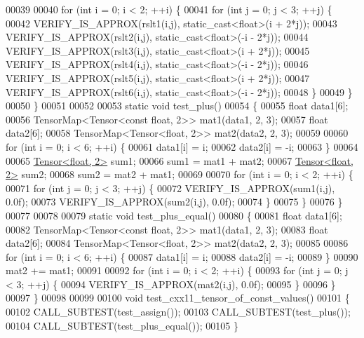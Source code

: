 \begin{DoxyCode}
00039 
00040   \textcolor{keywordflow}{for} (\textcolor{keywordtype}{int} i = 0; i < 2; ++i) \{
00041     \textcolor{keywordflow}{for} (\textcolor{keywordtype}{int} j = 0; j < 3; ++j) \{
00042       VERIFY\_IS\_APPROX(rslt1(i,j), static\_cast<float>(i + 2*j));
00043       VERIFY\_IS\_APPROX(rslt2(i,j), static\_cast<float>(-i - 2*j));
00044       VERIFY\_IS\_APPROX(rslt3(i,j), static\_cast<float>(i + 2*j));
00045       VERIFY\_IS\_APPROX(rslt4(i,j), static\_cast<float>(-i - 2*j));
00046       VERIFY\_IS\_APPROX(rslt5(i,j), static\_cast<float>(i + 2*j));
00047       VERIFY\_IS\_APPROX(rslt6(i,j), static\_cast<float>(-i - 2*j));
00048     \}
00049   \}
00050 \}
00051 
00052 
00053 \textcolor{keyword}{static} \textcolor{keywordtype}{void} test\_plus()
00054 \{
00055   \textcolor{keywordtype}{float} data1[6];
00056   TensorMap<Tensor<const float, 2>> mat1(data1, 2, 3);
00057   \textcolor{keywordtype}{float} data2[6];
00058   TensorMap<Tensor<float, 2>> mat2(data2, 2, 3);
00059 
00060   \textcolor{keywordflow}{for} (\textcolor{keywordtype}{int} i = 0; i < 6; ++i) \{
00061     data1[i] = i;
00062     data2[i] = -i;
00063   \}
00064 
00065   \hyperlink{class_eigen_1_1_tensor}{Tensor<float, 2>} sum1;
00066   sum1 = mat1 + mat2;
00067   \hyperlink{class_eigen_1_1_tensor}{Tensor<float, 2>} sum2;
00068   sum2 = mat2 + mat1;
00069 
00070   \textcolor{keywordflow}{for} (\textcolor{keywordtype}{int} i = 0; i < 2; ++i) \{
00071     \textcolor{keywordflow}{for} (\textcolor{keywordtype}{int} j = 0; j < 3; ++j) \{
00072       VERIFY\_IS\_APPROX(sum1(i,j), 0.0f);
00073       VERIFY\_IS\_APPROX(sum2(i,j), 0.0f);
00074     \}
00075   \}
00076 \}
00077 
00078 
00079 \textcolor{keyword}{static} \textcolor{keywordtype}{void} test\_plus\_equal()
00080 \{
00081   \textcolor{keywordtype}{float} data1[6];
00082   TensorMap<Tensor<const float, 2>> mat1(data1, 2, 3);
00083   \textcolor{keywordtype}{float} data2[6];
00084   TensorMap<Tensor<float, 2>> mat2(data2, 2, 3);
00085 
00086   \textcolor{keywordflow}{for} (\textcolor{keywordtype}{int} i = 0; i < 6; ++i) \{
00087     data1[i] = i;
00088     data2[i] = -i;
00089   \}
00090   mat2 += mat1;
00091 
00092   \textcolor{keywordflow}{for} (\textcolor{keywordtype}{int} i = 0; i < 2; ++i) \{
00093     \textcolor{keywordflow}{for} (\textcolor{keywordtype}{int} j = 0; j < 3; ++j) \{
00094       VERIFY\_IS\_APPROX(mat2(i,j), 0.0f);
00095     \}
00096   \}
00097 \}
00098 
00099 
00100 \textcolor{keywordtype}{void} test\_cxx11\_tensor\_of\_const\_values()
00101 \{
00102   CALL\_SUBTEST(test\_assign());
00103   CALL\_SUBTEST(test\_plus());
00104   CALL\_SUBTEST(test\_plus\_equal());
00105 \}
\end{DoxyCode}
